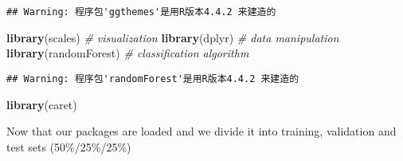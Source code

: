 \documentclass[
]{article}
\newenvironment{Shaded}{\begin{snugshade}}{\end{snugshade}}
\newcommand{\CommentTok}[1]{\textcolor[rgb]{0.56,0.35,0.01}{\textit{#1}}}
\newcommand{\FunctionTok}[1]{\textcolor[rgb]{0.13,0.29,0.53}{\textbf{#1}}}
\newcommand{\NormalTok}[1]{#1}
\newcommand{\StringTok}[1]{\textcolor[rgb]{0.31,0.60,0.02}{#1}}
\begin{document}
\begin{verbatim}
## Warning: 程序包'ggthemes'是用R版本4.4.2 来建造的
\end{verbatim}

\begin{Shaded}
\begin{Highlighting}[]
\FunctionTok{library}\NormalTok{(}\StringTok{\textquotesingle{}scales\textquotesingle{}}\NormalTok{) }\CommentTok{\# visualization}
\FunctionTok{library}\NormalTok{(}\StringTok{\textquotesingle{}dplyr\textquotesingle{}}\NormalTok{) }\CommentTok{\# data manipulation}
\FunctionTok{library}\NormalTok{(}\StringTok{\textquotesingle{}randomForest\textquotesingle{}}\NormalTok{) }\CommentTok{\# classification algorithm}
\end{Highlighting}
\end{Shaded}

\begin{verbatim}
## Warning: 程序包'randomForest'是用R版本4.4.2 来建造的
\end{verbatim}

\begin{Shaded}
\begin{Highlighting}[]
\FunctionTok{library}\NormalTok{(}\StringTok{\textquotesingle{}caret\textquotesingle{}}\NormalTok{)}
\end{Highlighting}
\end{Shaded}

Now that our packages are loaded and we divide it into training,
validation and test sets (50\%/25\%/25\%)
\end{document}
